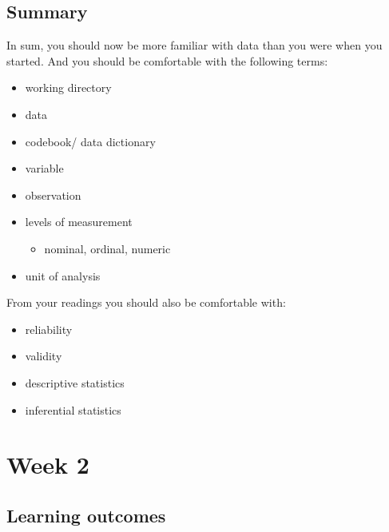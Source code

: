 \documentclass[]{book}
\providecommand{\tightlist}{%
  \setlength{\itemsep}{0pt}\setlength{\parskip}{0pt}}
\theoremstyle{definition}
\theoremstyle{definition}
\theoremstyle{definition}
\theoremstyle{remark}
\begin{document}
\hypertarget{summary}{%
\section{Summary}\label{summary}}

In sum, you should now be more familiar with data than you were when you
started. And you should be comfortable with the following terms:

\begin{itemize}
\tightlist
\item
  working directory
\item
  data
\item
  codebook/ data dictionary
\item
  variable
\item
  observation
\item
  levels of measurement

  \begin{itemize}
  \tightlist
  \item
    nominal, ordinal, numeric
  \end{itemize}
\item
  unit of analysis
\end{itemize}

From your readings you should also be comfortable with:

\begin{itemize}
\tightlist
\item
  reliability
\item
  validity
\item
  descriptive statistics
\item
  inferential statistics
\end{itemize}

\hypertarget{week2}{%
\chapter{Week 2}\label{week2}}

\hypertarget{learning-outcomes-1}{%
\section{Learning outcomes}\label{learning-outcomes-1}}
\end{document}
